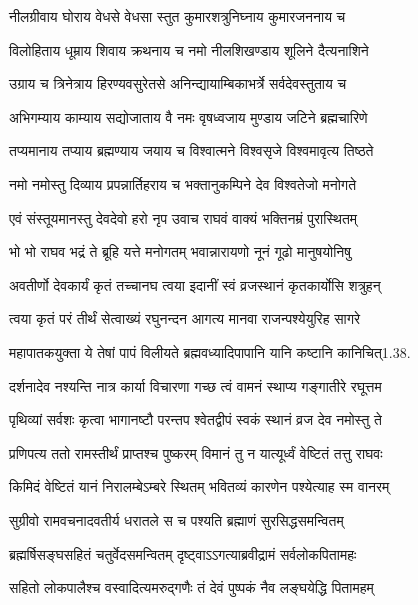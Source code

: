 \twolineshloka
{नीलग्रीवाय घोराय वेधसे वेधसा स्तुत}
{कुमारशत्रुनिघ्नाय कुमारजननाय च}%

\twolineshloka
{विलोहिताय धूम्राय शिवाय क्रथनाय च}
{नमो नीलशिखण्डाय शूलिने दैत्यनाशिने}%

\twolineshloka
{उग्राय च त्रिनेत्राय हिरण्यवसुरेतसे}
{अनिन्द्यायाम्बिकाभर्त्रे सर्वदेवस्तुताय च}%

\twolineshloka
{अभिगम्याय काम्याय सद्योजाताय वै नमः}
{वृषध्वजाय मुण्डाय जटिने ब्रह्मचारिणे}%

\twolineshloka
{तप्यमानाय तप्याय ब्रह्मण्याय जयाय च}
{विश्वात्मने विश्वसृजे विश्वमावृत्य तिष्ठते}%

\twolineshloka
{नमो नमोस्तु दिव्याय प्रपन्नार्तिहराय च}
{भक्तानुकम्पिने देव विश्वतेजो मनोगते}%


\twolineshloka
{एवं संस्तूयमानस्तु देवदेवो हरो नृप}
{उवाच राघवं वाक्यं भक्तिनम्रं पुरास्थितम्}%


\twolineshloka
{भो भो राघव भद्रं ते ब्रूहि यत्ते मनोगतम्}
{भवान्नारायणो नूनं गूढो मानुषयोनिषु}%

\twolineshloka
{अवतीर्णो देवकार्यं कृतं तच्चानघ त्वया}
{इदानीं स्वं व्रजस्थानं कृतकार्योसि शत्रुहन्}%

\twolineshloka
{त्वया कृतं परं तीर्थं सेत्वाख्यं रघुनन्दन}
{आगत्य मानवा राजन्पश्येयुरिह सागरे}%

\twolineshloka
{महापातकयुक्ता ये तेषां पापं विलीयते}
{ब्रह्मवध्यादिपापानि यानि कष्टानि कानिचित्1.38.}%

\twolineshloka
{दर्शनादेव नश्यन्ति नात्र कार्या विचारणा}
{गच्छ त्वं वामनं स्थाप्य गङ्गातीरे रघूत्तम}%

\twolineshloka
{पृथिव्यां सर्वशः कृत्वा भागानष्टौ परन्तप}
{श्वेतद्वीपं स्वकं स्थानं व्रज देव नमोस्तु ते}%

\twolineshloka
{प्रणिपत्य ततो रामस्तीर्थं प्राप्तश्च पुष्करम्}
{विमानं तु न यात्यूर्ध्वं वेष्टितं तत्तु राघवः}%

\twolineshloka
{किमिदं वेष्टितं यानं निरालम्बेऽम्बरे स्थितम्}
{भवितव्यं कारणेन पश्येत्याह स्म वानरम्}%

\twolineshloka
{सुग्रीवो रामवचनादवतीर्य धरातले}
{स च पश्यति ब्रह्माणं सुरसिद्धसमन्वितम्}%

\twolineshloka
{ब्रह्मर्षिसङ्घसहितं चतुर्वेदसमन्वितम्}
{दृष्ट्वाऽऽगत्याब्रवीद्रामं सर्वलोकपितामहः}%

\twolineshloka
{सहितो लोकपालैश्च वस्वादित्यमरुद्गणैः}
{तं देवं पुष्पकं नैव लङ्घयेद्धि पितामहम्}%

